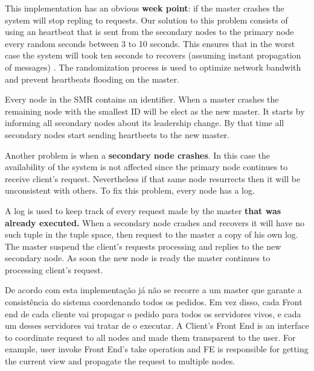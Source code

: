 \documentclass[times, 10pt,twocolumn]{article}
\begin{document}
This implementation has an obvious \textbf{week point}: if the master crashes 
the system will stop repling to requests.
Our solution to this problem consists of using an heartbeat that is sent from the
secondary nodes to the primary node every random seconds between 3 to 10 seconds.
This ensures that in the worst case the system will took ten seconds to
recovers (assuming instant propagation of messages) . 
The randomization process is used to optimize network bandwith and
prevent heartbeats flooding on the master.

Every node in the SMR contains an identifier. When a master crashes the remaining
node with the smallest ID will be elect as the new master. It starts by informing
all secondary nodes about its leadership change. By that time all secondary nodes
start sending heartbeets to the new master.

Another problem is when a \textbf{secondary node crashes}. In this case the
availability of the system is not affected since the primary node continues 
to receive client's request. Nevertheless if that same node resurrects then it
will be unconsistent with others. To fix this problem, every node has a log.

A log is used to keep track of every request made by the master 
\textbf{that was already executed.} When a secondary node crashes and recovers
it will have no such tuple in the tuple space, then request to the master
a copy of his own log. The master suspend the client's requests processing and
replies to the new secondary node. As soon the new node is ready the master
continues to processing client's request.



De acordo com esta implementação já não se recorre a um master que garante a 
consistência do sistema coordenando todos os pedidos. Em vez disso,
cada Front end de cada cliente vai propagar o pedido para todos os servidores vivos,
e cada um desses servidores vai tratar de o executar.
A Client's Front End is an interface to coordinate request to all nodes and made
them transparent to the user. For example, user invoke Front End's take operation
and FE is responsible for getting the current view and propagate the request
to multiple nodes.


\end{document}
